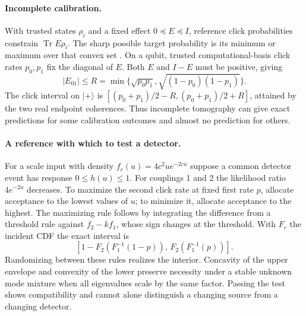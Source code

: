 \documentclass[11pt,letterpaper]{article}
\newcommand{\tr}{\operatorname{Tr}}\newcommand{\TV}{\operatorname{TV}}\newcommand{\E}{\mathbb E}\newcommand{\id}{\mathbb I}\newcommand{\calB}{\mathcal B}\newcommand{\norm}[1]{\left\lVert#1\right\rVert}
\begin{document}
\paragraph{Incomplete calibration.}
With trusted states $\rho_i$ and a fixed effect $0\preceq E\preceq I$, reference click probabilities constrain $\tr E\rho_i$. The sharp possible target probability is its minimum or maximum over that convex set \cite{keith}. On a qubit, trusted computational-basis click rates $p_0,p_1$ fix the diagonal of $E$. Both $E$ and $I-E$ must be positive, giving
\[
 |E_{01}|\le R=\min\{\sqrt{p_0p_1},\sqrt{(1-p_0)(1-p_1)}\}.
\]
The click interval on $|+\rangle$ is $[(p_0+p_1)/2-R,(p_0+p_1)/2+R]$, attained by the two real endpoint coherences. Thus incomplete tomography can give exact predictions for some calibration outcomes and almost no prediction for others.

\paragraph{A reference with which to test a detector.}
For a scale input with density $f_c(u)=4c^2u e^{-2cu}$ suppose a common detector event has response $0\le h(u)\le1$. For couplings 1 and 2 the likelihood ratio $4e^{-2u}$ decreases. To maximize the second click rate at fixed first rate $p$, allocate acceptance to the lowest values of $u$; to minimize it, allocate acceptance to the highest. The maximizing rule follows by integrating the difference from a threshold rule against $f_2-kf_1$, whose sign changes at the threshold. With $F_c$ the incident CDF the exact interval is
\[
 [1-F_2(F_1^{-1}(1-p)),\,F_2(F_1^{-1}(p))].
\]
Randomizing between these rules realizes the interior. Concavity of the upper envelope and convexity of the lower preserve necessity under a stable unknown mode mixture when all eigenvalues scale by the same factor. Passing the test shows compatibility and cannot alone distinguish a changing source from a changing detector.
\end{document}
